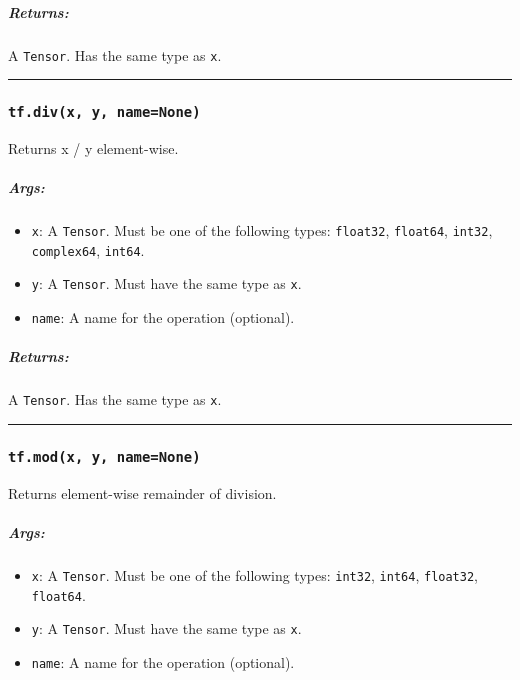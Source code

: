 \subparagraph{Returns: }\label{returns-2}

A \texttt{Tensor}. Has the same type as \texttt{x}.

\begin{center}\rule{0.5\linewidth}{\linethickness}\end{center}

\subsubsection{\texorpdfstring{\texttt{tf.div(x,\ y,\ name=None)}
}{tf.div(x, y, name=None) }}\label{tf.divx-y-namenone}

Returns x / y element-wise.

\subparagraph{Args: }\label{args-3}

\begin{itemize}
\tightlist
\item
  \texttt{x}: A \texttt{Tensor}. Must be one of the following types:
  \texttt{float32}, \texttt{float64}, \texttt{int32},
  \texttt{complex64}, \texttt{int64}.
\item
  \texttt{y}: A \texttt{Tensor}. Must have the same type as \texttt{x}.
\item
  \texttt{name}: A name for the operation (optional).
\end{itemize}

\subparagraph{Returns: }\label{returns-3}

A \texttt{Tensor}. Has the same type as \texttt{x}.

\begin{center}\rule{0.5\linewidth}{\linethickness}\end{center}

\subsubsection{\texorpdfstring{\texttt{tf.mod(x,\ y,\ name=None)}
}{tf.mod(x, y, name=None) }}\label{tf.modx-y-namenone}

Returns element-wise remainder of division.

\subparagraph{Args: }\label{args-4}

\begin{itemize}
\tightlist
\item
  \texttt{x}: A \texttt{Tensor}. Must be one of the following types:
  \texttt{int32}, \texttt{int64}, \texttt{float32}, \texttt{float64}.
\item
  \texttt{y}: A \texttt{Tensor}. Must have the same type as \texttt{x}.
\item
  \texttt{name}: A name for the operation (optional).
\end{itemize}


